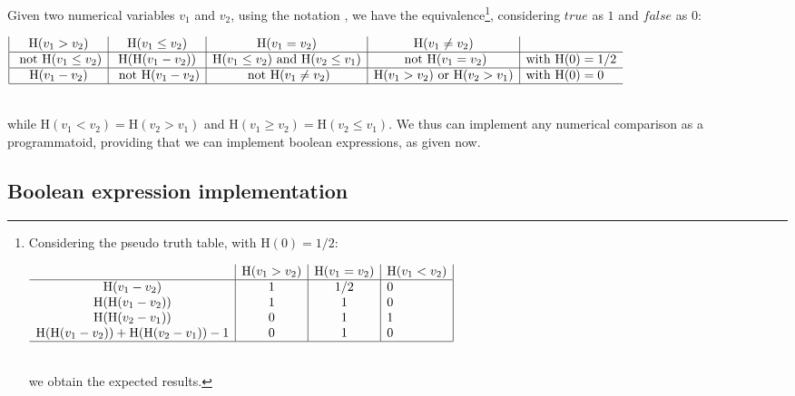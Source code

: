 \documentclass[a4]{article} \usepackage[left=2cm,right=3cm,top=1cm,bottom=2cm]{geometry}
\newcommand{\eqline}[1]{~\vspace{0.1cm}\\\centerline{$#1$}\vspace{0.1cm}\\}
\begin{document}
Given two numerical variables $v_1$ and $v_2$, using the notation ,
we have the equivalence\footnote{
Considering the pseudo truth table, with $\mbox{H}(0) = 1/2$:
\eqline{\begin{array}{c|c|c|l|}
                                                             &\mbox{H}(v_1 > v_2) &\mbox{H}(v_1 = v_2) & \mbox{H}(v_1 < v_2) \\\hline
    \mbox{H}(v_1 - v_2)                                      & 1                  &   1/2           & 0 \\
    \mbox{H}(\mbox{H}(v_1 - v_2))                                 & 1                 &   1              & 0 \\
    \mbox{H}(\mbox{H}(v_2 - v_1))                                 & 0                 &   1              & 1 \\
    \mbox{H}(\mbox{H}(v_1 - v_2)) +\mbox{H}(\mbox{H}(v_2 - v_1))-1   & 0                 &   1              & 0 \\ \hline
\end{array}}  we obtain the expected results.}, considering $true$ as $1$ and $false$ as $0$:
\eqline{\begin{array}{|c|c|c|c|l}
    \mbox{H}(v_1 > v_2)                            & \mbox{H}(v_1 \le v_2)                        & \mbox{H}(v_1 = v_2)                                                    & \mbox{H}(v_1 \ne v_2)         \\  \hline
    \mbox{ not } \mbox{H}(v_1 \le v_2)   & \mbox{H}(\mbox{H}(v_1 - v_2))                      & \mbox{H}(v_1 \le v_2)  \mbox{ and } \mbox{H}(v_2 \le v_1)   & \mbox{ not } \mbox{H}(v_1 = v_2)                  & \mbox{with } \mbox{H}(0) = 1/2\\ \hline
    \mbox{H}(v_1 - v_2)                            & \mbox{ not } \mbox{H}(v_1 - v_2)     & \mbox{ not } \mbox{H}(v_1 \ne v_2)                          &\mbox{H}(v_1 > v_2) \mbox{ or } \mbox{H}(v_2> v_1)  & \mbox{with } \mbox{H}(0) = 0\\
\hline\end{array}}
while $\mbox{H}(v_1 < v_2) = \mbox{H}(v_2 > v_1)$ and $\mbox{H}(v_1 \ge v_2) = \mbox{H}(v_2 \le v_1)$. We thus can implement any numerical comparison as a programmatoid, providing that we can implement boolean expressions, as given now.

\subsection{Boolean expression implementation}
\end{document}
